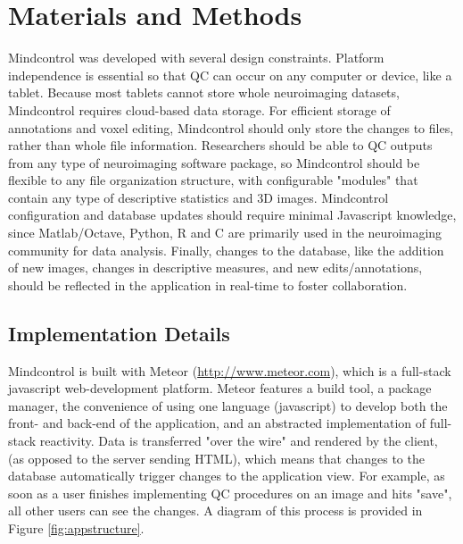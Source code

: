 \section{Materials and Methods}

Mindcontrol was developed with several design constraints. Platform independence is essential so that QC can occur on any computer or device, like a tablet. Because most tablets cannot store whole neuroimaging datasets, Mindcontrol requires cloud-based data storage. For efficient storage of annotations and voxel editing, Mindcontrol should only store the changes to files, rather than whole file information. Researchers should be able to QC outputs from any type of neuroimaging software package, so Mindcontrol should be flexible to any file organization structure, with configurable "modules" that contain any type of descriptive statistics and 3D images. Mindcontrol configuration and database updates should require minimal Javascript knowledge, since Matlab/Octave, Python, R and C are primarily used in the neuroimaging community for data analysis. Finally, changes to the database, like the addition of new images, changes in descriptive measures, and new edits/annotations, should be reflected in the application in real-time to foster collaboration.  


\subsection{Implementation Details}

Mindcontrol is built with Meteor (\href{http://www.meteor.com}{http://www.meteor.com}), which is a full-stack javascript web-development platform. Meteor features a build tool, a package manager, the convenience of using one language (javascript) to develop both the front- and back-end of the application, and an abstracted implementation of full-stack reactivity. Data is transferred "over the wire" and rendered by the client, (as opposed to the server sending HTML), which means that changes to the database automatically trigger changes to the application view. For example, as soon as a user finishes implementing QC procedures on an image and hits "save", all other users can see the changes. A diagram of this process is provided in Figure \ref{fig:appstructure}.




